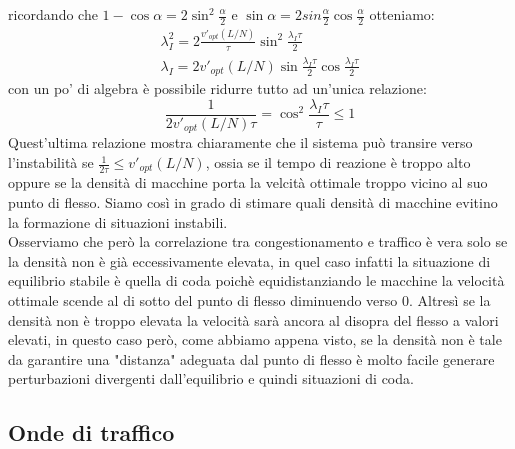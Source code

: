 ricordando che $1-\cos\alpha=2\sin^2\frac{\alpha}{2}$ e $\sin\alpha=2sin\frac{\alpha}{2}\cos\frac{\alpha}{2}$ otteniamo:
\begin{equation*}
	\begin{gathered}
		\lambda_I^2=2\frac{v'_{opt}(L/N)}{\tau}\sin^2\frac{\lambda_I\tau}{2}\\
		\lambda_I=2v'_{opt}(L/N)\sin\frac{\lambda_I\tau}{2}\cos\frac{\lambda_I\tau}{2}
	\end{gathered}
\end{equation*}
con un po' di algebra è possibile ridurre tutto ad un'unica relazione:
\begin{equation}
	\frac{1}{2v'_{opt}(L/N)\tau}=\cos^2\frac{\lambda_I\tau}{\tau}\leq1
\end{equation}
Quest'ultima relazione mostra chiaramente che il sistema può transire verso l'instabilità se $ \frac{1}{2\tau}\leq v'_{opt}(L/N)$, ossia se il tempo di reazione è troppo alto oppure se la densità di macchine porta la velcità ottimale troppo vicino al suo punto di flesso. Siamo così in grado di stimare quali densità di macchine evitino la formazione di situazioni instabili. \\

Osserviamo che però la correlazione tra congestionamento e traffico è vera solo se la densità non è già eccessivamente elevata, in quel caso infatti la situazione di equilibrio stabile è quella di coda poichè equidistanziando le macchine la velocità ottimale scende al di sotto del punto di flesso diminuendo verso $0$. Altresì se la densità non è troppo elevata la velocità sarà ancora al disopra del flesso a valori elevati, in questo caso però, come abbiamo appena visto, se la densità non è tale da garantire una "distanza" adeguata dal punto di flesso è molto facile generare perturbazioni divergenti dall'equilibrio e quindi situazioni di coda.

\subsection{Onde di traffico}

